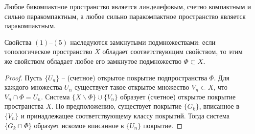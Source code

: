 \begin{note}
    Любое бикомпактное пространство является линделефовым, счетно компактным и сильно паракомпактным, а любое сильно паракомпактное пространство является паракомпактным.
\end{note}

\begin{proposition}
    Свойства $(1)$--$(5)$ наследуются замкнутыми подмножествами: если топологическое пространство $X$ обладает соответствующим свойством, то этим же свойством обладает любое его замкнутое подмножество $\Phi \subset X$.
\end{proposition}

\begin{proof}
    Пусть $\{U_n\}$ -- (счетное) открытое покрытие подпространства $\Phi$. Для каждого множества $U_n$ существует такое открытое множество $V_n \subset X$, что $V_n \cap \Phi = U_n$. Система $\{X\backslash \Phi\}\cup\{V_n\}$ образует (счетное) открытое покрытие пространства $X$. По предположению, существует покрытие $\{G_k\}$, вписанное в $\{V_n\}$ и принадлежащее соответствующему классу покрытий. Тогда система $\{G_k \cap \Phi\}$ образует искомое вписанное в $\{U_n\}$ покрытие.
\end{proof}